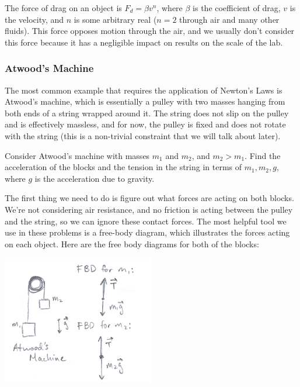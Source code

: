 \begin{mdframed}[frametitle=The Drag Force]
	The force of drag on an object is $F_d = \beta v^n$, where $\beta$ is the coefficient of drag, $v$ is the velocity, and $n$ is some arbitrary real ($n=2$ through air and many other fluids). This force opposes motion through the air, and we usually don't consider this force because it has a negligible impact on results on the scale of the lab. 
\end{mdframed}
\subsubsection{Atwood's Machine}
The most common example that requires the application of Newton's Laws is Atwood's machine, which is essentially a pulley with two masses hanging from both ends of a string wrapped around it. The string does not slip on the pulley and is effectively massless, and for now, the pulley is fixed and does not rotate with the string (this is a non-trivial constraint that we will talk about later). \\
\begin{mdframed}[frametitle=Atwood's Machine]
Consider Atwood's machine with masses $m_1$ and $m_2$, and $m_2 > m_1$. Find the acceleration of the blocks and the tension in the string in terms of $m_1, m_2, g$, where $g$ is the acceleration due to gravity.
\end{mdframed}
The first thing we need to do is figure out what forces are acting on both blocks. We're not considering air resistance, and no friction is acting between the pulley and the string, so we can ignore these contact forces. The most helpful tool we use in these problems is a free-body diagram, which illustrates the forces acting on each object. Here are the free body diagrams for both of the blocks: 
\begin{center}
	\includegraphics[width=0.5\textwidth]{images/mechintro/atwoods_machine.png}\\
\end{center}
